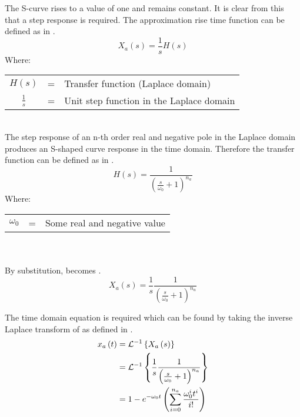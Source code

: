 The S-curve rises to a value of one and remains constant. It is clear from this that a step response is required. The approximation rise time function can be defined as in .
\begin{equation}
    X_a \left( s \right) = \frac{1}{s} H \left( s \right)
    \label{eqn:app_approx_rise_laplace}
\end{equation}
Where: \\
\begin{tabular}{cll}
    $H \left( s \right)$ & = & Transfer function (Laplace domain) \\
    $\frac{1}{s}$ & = & Unit step function in the Laplace domain
\end{tabular}\\
The step response of an n-th order real and negative pole in the Laplace domain produces an S-shaped curve response in the time domain. Therefore the transfer function can be defined as in .
\begin{equation}
    H \left( s \right) = \frac{1}{\left( \frac{s}{\omega_0} + 1 \right)^{n_a}}
    \label{eqn:app_tf_func}
\end{equation}
Where: \\
\begin{tabular}{cll}
    $\omega_0$ & = & Some real and negative value
\end{tabular}\\\\
By substitution,  becomes .
\begin{equation}
    X_a \left( s \right) = \frac{1}{s} \frac{1}{\left( \frac{s}{\omega_0} + 1 \right)^{n_a}}
    \label{eqn:app_approx_rise_laplace_final}
\end{equation}

The time domain equation is required which can be found by taking the inverse Laplace transform of  as defined in .
\begin{align}
    x_a \left( t \right) & = \mathcal{L}^{-1} \left \{ X_a \left( s \right) \right \} \notag\\
     & = \mathcal{L}^{-1} \left \{ \frac{1}{s} \frac{1}{\left( \frac{s}{\omega_0} + 1 \right)^{n_a}} \right \} \notag\\
     & = 1 - e^{-\omega_0 t} \left ( \sum\limits_{i=0}^{n_a} \frac{\omega_0^i t^i}{i!} \right )
    \label{eqn:app_approx_rise}
\end{align}

